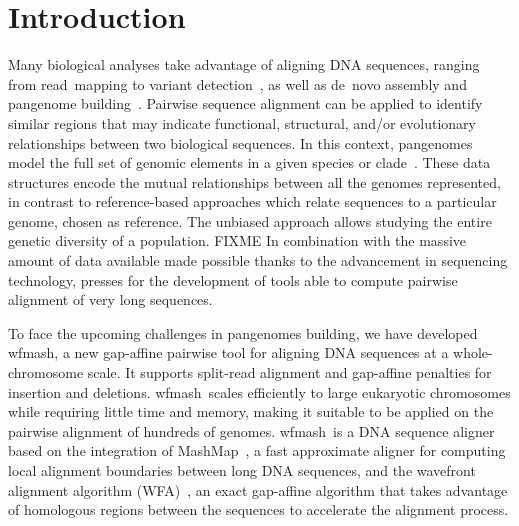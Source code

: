 \documentclass{bioinfo}
\newcommand{\wfmash}{wfmash}
\begin{document}
    \maketitle


    \section{Introduction}

    Many biological analyses take advantage of aligning DNA sequences, ranging from read~mapping
    \citep{22388286, BWA_MEM, 23103880} to variant detection~\citep{21478889}, as well as de~novo
    assembly \citep{19251739} and pangenome building~\citep{33177663, 33066802}. Pairwise sequence alignment
    can be applied to identify similar regions that may indicate functional, structural, and/or evolutionary
    relationships between two biological sequences. In this context, pangenomes model the full set
    of genomic elements in a given species or clade~\citep{32453966}. These data structures encode the mutual
    relationships between all the genomes represented, in contrast to reference-based approaches which
    relate sequences to a particular genome, chosen as reference. The unbiased approach allows studying
    the entire genetic diversity of a population. FIXME In combination with the massive amount
    of data available made possible thanks to the advancement in sequencing technology, presses for the
    development of tools able to compute pairwise alignment of very long sequences.

    To face the upcoming challenges in pangenomes building, we have developed \wfmash\/, a new gap-affine
    pairwise tool for aligning DNA sequences at a whole-chromosome scale. It supports split-read alignment
    and gap-affine penalties for insertion and deletions. \wfmash\ scales efficiently to large eukaryotic
    chromosomes while requiring little time and memory, making it suitable to be applied on the pairwise
    alignment of hundreds of genomes. \wfmash\ is a DNA sequence aligner based on the integration of
    MashMap~\citep{30423094}, a fast approximate aligner for computing local alignment boundaries between
    long DNA sequences, and the wavefront alignment algorithm (WFA)~\citep{32915952}, an exact gap-affine algorithm
    that takes advantage of homologous regions between the sequences to accelerate the alignment process.

\end{document}
